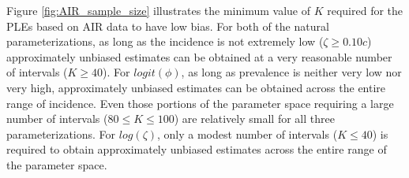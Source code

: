 \documentclass[man, noextraspace, floatsintext]{apa6}\usepackage[]{graphicx}\usepackage[]{color}
\begin{document}
Figure \ref{fig:AIR_sample_size} illustrates the minimum value of $K$ required for the PLEs based on AIR data to have low bias. For both of the natural parameterizations, as long as the incidence is not extremely low ($\zeta \geq 0.10c$) approximately unbiased estimates can be obtained at a very reasonable number of intervals ($K \geq 40$). For $logit(\phi)$, as long as prevalence is neither very low nor very high, approximately unbiased estimates can be obtained across the entire range of incidence. Even those portions of the parameter space requiring a large number of intervals ($80 \leq K \leq 100$) are relatively small for all three parameterizations. For $log(\zeta)$, only a modest number of intervals ($K \leq 40$) is required to obtain approximately unbiased estimates across the entire range of the parameter space.
\end{document}
